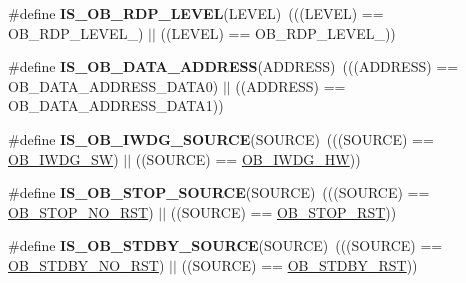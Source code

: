\begin{DoxyCompactItemize}
\item 
\mbox{\label{group___f_l_a_s_h_ex___private___macros_ga8d602a97cd688390b3d1956d9970e712}} 
\#define {\bfseries I\+S\+\_\+\+O\+B\+\_\+\+R\+D\+P\+\_\+\+L\+E\+V\+EL}(L\+E\+V\+EL)~(((L\+E\+V\+EL) == O\+B\+\_\+\+R\+D\+P\+\_\+\+L\+E\+V\+E\+L\+\_) $\vert$$\vert$ ((L\+E\+V\+EL) == O\+B\+\_\+\+R\+D\+P\+\_\+\+L\+E\+V\+E\+L\+\_))
\item 
\mbox{\label{group___f_l_a_s_h_ex___private___macros_ga73fcac8d5f301a5c98518374ae926633}} 
\#define {\bfseries I\+S\+\_\+\+O\+B\+\_\+\+D\+A\+T\+A\+\_\+\+A\+D\+D\+R\+E\+SS}(A\+D\+D\+R\+E\+SS)~(((A\+D\+D\+R\+E\+SS) == O\+B\+\_\+\+D\+A\+T\+A\+\_\+\+A\+D\+D\+R\+E\+S\+S\+\_\+\+D\+A\+T\+A0) $\vert$$\vert$ ((A\+D\+D\+R\+E\+SS) == O\+B\+\_\+\+D\+A\+T\+A\+\_\+\+A\+D\+D\+R\+E\+S\+S\+\_\+\+D\+A\+T\+A1))
\item 
\mbox{\label{group___f_l_a_s_h_ex___private___macros_gaf2871652c08e76499d9449be6556f12c}} 
\#define {\bfseries I\+S\+\_\+\+O\+B\+\_\+\+I\+W\+D\+G\+\_\+\+S\+O\+U\+R\+CE}(S\+O\+U\+R\+CE)~(((S\+O\+U\+R\+CE) == \hyperlink{group___f_l_a_s_h_ex___o_b___i_watchdog_ga5a357e232c955444c3f2ccb9a937ffce}{O\+B\+\_\+\+I\+W\+D\+G\+\_\+\+SW}) $\vert$$\vert$ ((S\+O\+U\+R\+CE) == \hyperlink{group___f_l_a_s_h_ex___o_b___i_watchdog_gadfcbfa963d79c339ec8e2d5a7734e47a}{O\+B\+\_\+\+I\+W\+D\+G\+\_\+\+HW}))
\item 
\mbox{\label{group___f_l_a_s_h_ex___private___macros_ga131ae3434f300c8317dd6b3b349c7cab}} 
\#define {\bfseries I\+S\+\_\+\+O\+B\+\_\+\+S\+T\+O\+P\+\_\+\+S\+O\+U\+R\+CE}(S\+O\+U\+R\+CE)~(((S\+O\+U\+R\+CE) == \hyperlink{group___f_l_a_s_h_ex___o_b__n_r_s_t___s_t_o_p_ga7344fe0ec25c5eb2d11db7c855325436}{O\+B\+\_\+\+S\+T\+O\+P\+\_\+\+N\+O\+\_\+\+R\+ST}) $\vert$$\vert$ ((S\+O\+U\+R\+CE) == \hyperlink{group___f_l_a_s_h_ex___o_b__n_r_s_t___s_t_o_p_gaef92c03b1f279c532bfa13d3bb074b57}{O\+B\+\_\+\+S\+T\+O\+P\+\_\+\+R\+ST}))
\item 
\mbox{\label{group___f_l_a_s_h_ex___private___macros_ga8a05393df3a5e89551b4e2e1e8c5b884}} 
\#define {\bfseries I\+S\+\_\+\+O\+B\+\_\+\+S\+T\+D\+B\+Y\+\_\+\+S\+O\+U\+R\+CE}(S\+O\+U\+R\+CE)~(((S\+O\+U\+R\+CE) == \hyperlink{group___f_l_a_s_h_ex___o_b__n_r_s_t___s_t_d_b_y_gad776ed7b3b9a98013aac9976eedb7e94}{O\+B\+\_\+\+S\+T\+D\+B\+Y\+\_\+\+N\+O\+\_\+\+R\+ST}) $\vert$$\vert$ ((S\+O\+U\+R\+CE) == \hyperlink{group___f_l_a_s_h_ex___o_b__n_r_s_t___s_t_d_b_y_ga69451a6f69247528f58735c9c83499ce}{O\+B\+\_\+\+S\+T\+D\+B\+Y\+\_\+\+R\+ST}))
$$
\end{DoxyCompactItemize}
